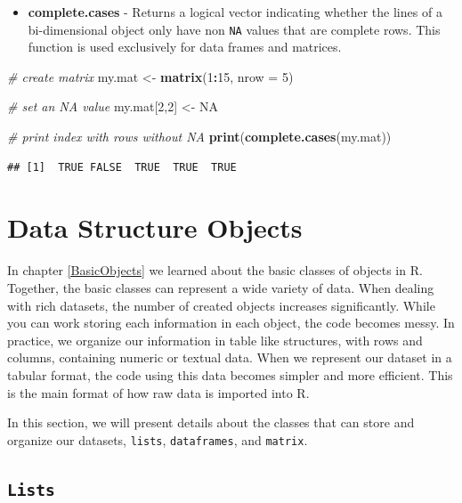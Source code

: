 \documentclass[11pt,]{book}
\newenvironment{Shaded}{\begin{snugshade}}{\end{snugshade}}
\newcommand{\KeywordTok}[1]{\textcolor[rgb]{0.27,0.27,0.27}{\textbf{#1}}}
\newcommand{\DataTypeTok}[1]{\textcolor[rgb]{0.27,0.27,0.27}{#1}}
\newcommand{\DecValTok}[1]{\textcolor[rgb]{0.06,0.06,0.06}{#1}}
\newcommand{\StringTok}[1]{\textcolor[rgb]{0.5,0.5,0.5}{#1}}
\newcommand{\CommentTok}[1]{\textcolor[rgb]{0.56,0.35,0.01}{\textit{#1}}}
\newcommand{\OtherTok}[1]{\textcolor[rgb]{0.56,0.35,0.01}{#1}}
\newcommand{\OperatorTok}[1]{\textcolor[rgb]{0.81,0.36,0.00}{\textbf{#1}}}
\newcommand{\NormalTok}[1]{#1}
\providecommand{\tightlist}{%
  \setlength{\itemsep}{0pt}\setlength{\parskip}{0pt}}
\begin{document}
\begin{itemize}
\tightlist
\item
  \textbf{complete.cases} - Returns a logical vector indicating whether
  the lines of a bi-dimensional object only have non \texttt{NA} values
  that are complete rows. This function is used exclusively for data
  frames and matrices. 
\end{itemize}

\begin{Shaded}
\begin{Highlighting}[]
\CommentTok{# create matrix}
\NormalTok{my.mat <-}\StringTok{ }\KeywordTok{matrix}\NormalTok{(}\DecValTok{1}\OperatorTok{:}\DecValTok{15}\NormalTok{, }\DataTypeTok{nrow =} \DecValTok{5}\NormalTok{)}

\CommentTok{# set an NA value}
\NormalTok{my.mat[}\DecValTok{2}\NormalTok{,}\DecValTok{2}\NormalTok{] <-}\StringTok{ }\OtherTok{NA}

\CommentTok{# print index with rows without NA}
\KeywordTok{print}\NormalTok{(}\KeywordTok{complete.cases}\NormalTok{(my.mat))}
\end{Highlighting}
\end{Shaded}

\begin{verbatim}
## [1]  TRUE FALSE  TRUE  TRUE  TRUE
\end{verbatim}

\chapter{Data Structure Objects}\label{DataStructureObjects}

In chapter \ref{BasicObjects} we learned about the basic classes of
objects in R. Together, the basic classes can represent a wide variety
of data. When dealing with rich datasets, the number of created objects
increases significantly. While you can work storing each information in
each object, the code becomes messy. In practice, we organize our
information in table like structures, with rows and columns, containing
numeric or textual data. When we represent our dataset in a tabular
format, the code using this data becomes simpler and more efficient.
This is the main format of how raw data is imported into R.

In this section, we will present details about the classes that can
store and organize our datasets, \texttt{lists}, \texttt{dataframes},
and \texttt{matrix}.

\section{\texorpdfstring{\texttt{Lists}}{Lists}}\label{lists}
\end{document}
